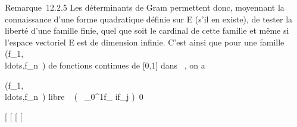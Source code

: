 \documentclass[]{article}
\begin{document}
Remarque~12.2.5 Les déterminants de Gram permettent donc, moyennant la
connaissance d'une forme quadratique définie sur E (s'il en existe), de
tester la liberté d'une famille finie, quel que soit le cardinal de
cette famille et même si l'espace vectoriel E est de dimension infinie.
C'est ainsi que pour une famille
(f_1,\\ldots,f_n~)
de fonctions continues de [0,1] dans ~, on a

(f_1,\\ldots,f_n~)\text
libre  \Leftrightarrow
{}~
\left (\int ~
_0^1f_ if_j\right
)\neq~0

[
[
[
[
\end{document}
